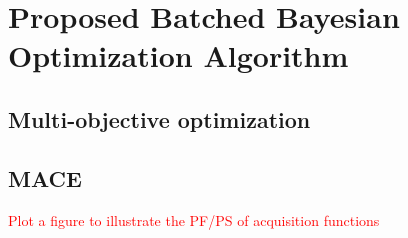 \section{Proposed Batched Bayesian Optimization Algorithm}

\subsection{Multi-objective optimization}

\subsection{MACE}

\textcolor{red}{Plot a figure to illustrate the PF/PS of acquisition functions}
